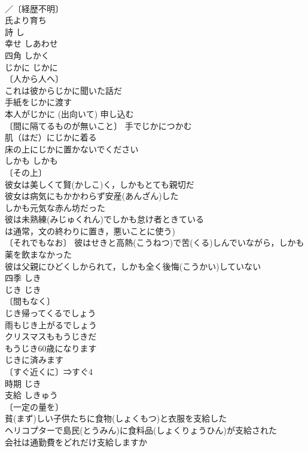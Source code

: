 \documentclass[8pt]{extreport}
\begin{document}
\begin{CJK}{UTF8}{min}
\\	／〔経歴不明〕
\\	氏より育ち 
\\	詩	し	
\\	幸せ	しあわせ	
\\	四角	しかく	
\\	じかに	じかに	
\\	〔人から人へ〕
\\	これは彼からじかに聞いた話だ 
\\	手紙をじかに渡す 
\\	本人がじかに (出向いて) 申し込む 
\\	〔間に隔てるものが無いこと〕 手でじかにつかむ 
\\	肌（はだ）にじかに着る 
\\	床の上にじかに置かないでください 
\\	しかも	しかも	
\\	〔その上〕
\\	彼女は美しくて賢(かしこ)く，しかもとても親切だ 
\\	彼女は病気にもかかわらず安産(あんざん)した
\\	しかも元気な赤ん坊だった 
\\	彼は未熟練(みじゅくれん)でしかも怠け者ときている 
\\	は通常，文の終わりに置き，悪いことに使う) 
\\	〔それでもなお〕 彼はせきと高熱(こうねつ)で苦(くる)しんでいながら，しかも薬を飲まなかった 
\\	彼は父親にひどくしかられて，しかも全く後悔(こうかい)していない 
\\	四季	しき	
\\	じき	じき	
\\	〔間もなく〕
\\	じき帰ってくるでしょう 
\\	雨もじき上がるでしょう 
\\	クリスマスももうじきだ 
\\	もうじき60歳になります 
\\	じきに済みます 
\\	〔すぐ近くに〕⇒すぐ4
\\	時期	じき	
\\	支給	しきゅう	
\\	〔一定の量を〕
\\	貧(まず)しい子供たちに食物(しょくもつ)と衣服を支給した 
\\	ヘリコプターで島民(とうみん)に食料品(しょくりょうひん)が支給された 
\\	会社は通勤費をどれだけ支給しますか 

\end{CJK}
\end{document}
